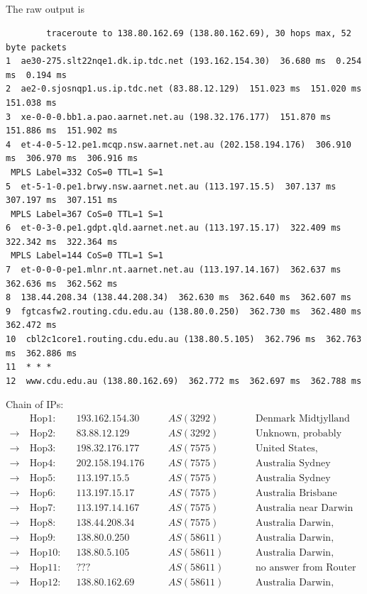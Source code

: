 \documentclass{article}
\begin{document}
    \subsection{}
    The raw output is
    \begin{verbatim}
        traceroute to 138.80.162.69 (138.80.162.69), 30 hops max, 52 byte packets
1  ae30-275.slt22nqe1.dk.ip.tdc.net (193.162.154.30)  36.680 ms  0.254 ms  0.194 ms
2  ae2-0.sjosnqp1.us.ip.tdc.net (83.88.12.129)  151.023 ms  151.020 ms  151.038 ms
3  xe-0-0-0.bb1.a.pao.aarnet.net.au (198.32.176.177)  151.870 ms  151.886 ms  151.902 ms
4  et-4-0-5-12.pe1.mcqp.nsw.aarnet.net.au (202.158.194.176)  306.910 ms  306.970 ms  306.916 ms
 MPLS Label=332 CoS=0 TTL=1 S=1
5  et-5-1-0.pe1.brwy.nsw.aarnet.net.au (113.197.15.5)  307.137 ms  307.197 ms  307.151 ms
 MPLS Label=367 CoS=0 TTL=1 S=1
6  et-0-3-0.pe1.gdpt.qld.aarnet.net.au (113.197.15.17)  322.409 ms  322.342 ms  322.364 ms
 MPLS Label=144 CoS=0 TTL=1 S=1
7  et-0-0-0-pe1.mlnr.nt.aarnet.net.au (113.197.14.167)  362.637 ms  362.636 ms  362.562 ms
8  138.44.208.34 (138.44.208.34)  362.630 ms  362.640 ms  362.607 ms
9  fgtcasfw2.routing.cdu.edu.au (138.80.0.250)  362.730 ms  362.480 ms  362.472 ms
10  cbl2c1core1.routing.cdu.edu.au (138.80.5.105)  362.796 ms  362.763 ms  362.886 ms
11  * * *
12  www.cdu.edu.au (138.80.162.69)  362.772 ms  362.697 ms  362.788 ms
    \end{verbatim}

    Chain of IPs: 
    \begin{align*}
        &\text{Hop1:} && 193.162.154.30 &&& AS(3292) &&&& \text{Denmark Midtjylland} \\
        \to\ &\text{Hop2:} && 83.88.12.129 &&& AS(3292) &&&& \text{Unknown, probably New York} \\
        \to\ &\text{Hop3:} && 198.32.176.177 &&& AS(7575) &&&& \text{United States, California, Palo Alto} \\
        \to\ &\text{Hop4:} && 202.158.194.176 &&& AS(7575) &&&& \text{Australia Sydney}\\
        \to\ &\text{Hop5:} && 113.197.15.5 &&& AS(7575) &&&& \text{Australia Sydney}\\
        \to\ &\text{Hop6:} && 113.197.15.17 &&& AS(7575) &&&& \text{Australia Brisbane} \\
        \to\ &\text{Hop7:} && 113.197.14.167 &&& AS(7575) &&&& \text{Australia near Darwin}\\
        \to\ &\text{Hop8:} && 138.44.208.34 &&& AS(7575) &&&& \text{Australia Darwin, access to Campus}\\
        \to\ &\text{Hop9:} && 138.80.0.250 &&& AS(58611) &&&& \text{Australia Darwin, Firewall-Cluster from CDU}\\
        \to\ &\text{Hop10:} && 138.80.5.105 &&& AS(58611) &&&& \text{Australia Darwin, Campus-Backbone-Core-Router}\\
        \to\ &\text{Hop11:} && ??? &&& AS(58611) &&&& \text{no answer from Router}\\
        \to\ &\text{Hop12:} && 138.80.162.69 &&& AS(58611) &&&& \text{Australia Darwin, Target}\\
    \end{align*}
\end{document}
